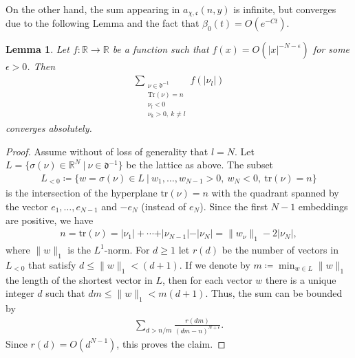 \documentclass[twoside,a4paper,10pt]{article} %
\newcommand{\8}{\infty}
\newcommand{\R}{\mathbb{R}}
\newcommand{\dfrak}{\mathfrak{d}}
\newcommand{\cfrak}{\mathfrak{c}}
\newcommand{\Tr}{\mathrm{Tr}}
\newcommand{\tr}{\mathrm{tr}}
\theoremstyle{mytheoremstyle}
\newtheorem{lem}[thm]{Lemma}
\theoremstyle{remark}
\numberwithin{equation}{section}
\begin{document}
On the other hand, the sum appearing in $a_{\chi,\cfrak}(n,y)$ is infinite, but converges due to the following Lemma and the fact that $\beta_0(t)=O(e^{-Ct})$.

\begin{lem} \label{convergence lemma} Let $f \colon \R \longrightarrow \R$ be a function such that $f(x)=O(\vert x \vert^{-N-\epsilon})$ for some $\epsilon>0$. Then
\begin{align}
\sum_{\substack{\nu \in \dfrak^{-1} \\ \Tr(\nu)=n \\ \nu_l<0 \\ \nu_k>0, \ k \neq l}}f(\vert \nu_l \vert)
\end{align}
converges absolutely.
\end{lem}
\begin{proof}
Assume without of loss of generality that $l=N$. Let $L=\{ \sigma(\nu) \in \R^N \ \vert \ \nu \in \dfrak^{-1} \}$ be the lattice as above. The subset
\begin{align}
L_{<0} \coloneqq \{ w=\sigma(\nu) \in L \ \vert \  w_1, \dots,w_{N-1}>0, \ w_N<0, \ \tr(\nu)=n\}
\end{align}
is the intersection of the hyperplane $\tr(\nu)=n$ with the quadrant spanned by the vector $e_1, \dots,e_{N-1}$ and $-e_N$ (instead of $e_N$). Since the first $N-1$ embeddings are positive, we have
\begin{align}
n=\tr(\nu)=\vert \nu_1 \vert+ \cdots+\vert \nu_{N-1} \vert-\vert \nu_N \vert =\lVert w_\nu\rVert_1-2\vert \nu_N \vert,
\end{align}
where $\lVert w \rVert_1$ is the $L^1$-norm. For $d \geq 1$ let $r(d)$ be the number of vectors in $L_{<0}$ that satisfy $d \leq \lVert w \rVert_1 < (d+1)$. If we denote by $m \coloneqq \min_{w \in L} \lVert w \rVert_1$ the length of the shortest vector in $L$, then for each vector $w$ there is a unique integer $d$ such that $ dm \leq \lVert w \rVert_1 < m(d+1)$. Thus, the sum can be bounded by
\begin{align}
\sum_{d>n/m} \frac{r(dm)}{(dm-n)^{N+\epsilon}}.
\end{align}
Since $r(d)=O(d^{N-1})$, this proves the claim.
\end{proof}
\end{document}
